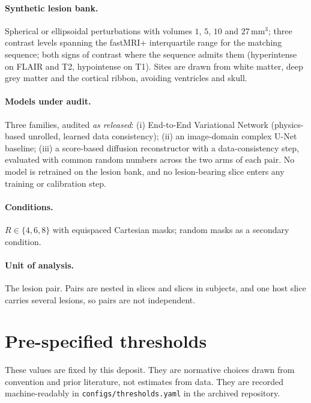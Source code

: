\documentclass[11pt,a4paper]{article}
\begin{document}
\paragraph{Synthetic lesion bank.} Spherical or ellipsoidal perturbations with
volumes $1$, $5$, $10$ and $27\,\mathrm{mm}^3$; three contrast levels spanning
the fastMRI+ interquartile range for the matching sequence; both signs of
contrast where the sequence admits them (hyperintense on FLAIR and T2,
hypointense on T1). Sites are drawn from white matter, deep grey matter and
the cortical ribbon, avoiding ventricles and skull.

\paragraph{Models under audit.} Three families, audited \emph{as released}:
(i) End-to-End Variational Network (physics-based unrolled, learned data
consistency); (ii) an image-domain complex U-Net baseline; (iii) a score-based
diffusion reconstructor with a data-consistency step, evaluated with common
random numbers across the two arms of each pair. No model is retrained on the
lesion bank, and no lesion-bearing slice enters any training or calibration
step.

\paragraph{Conditions.} $R \in \{4, 6, 8\}$ with equispaced Cartesian masks;
random masks as a secondary condition.

\paragraph{Unit of analysis.} The lesion pair. Pairs are nested in slices and
slices in subjects, and one host slice carries several lesions, so pairs are
not independent.

\section{Pre-specified thresholds}
\label{sec:thresholds}

These values are fixed by this deposit. They are normative choices drawn from
convention and prior literature, not estimates from data. They are recorded
machine-readably in \texttt{configs/thresholds.yaml} in the archived
repository.
\end{document}
